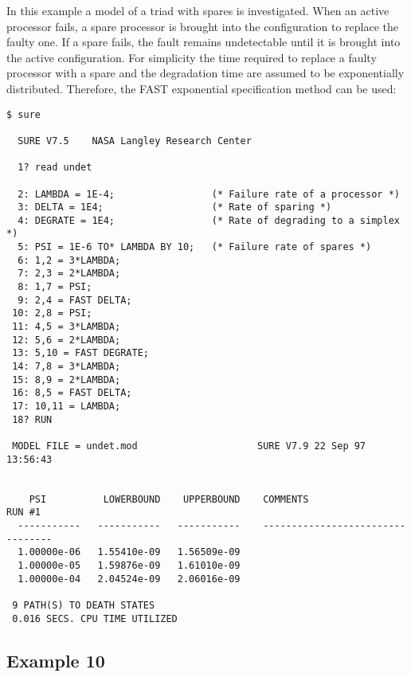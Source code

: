 In this example a model of a triad with spares is investigated.  When an
active processor fails, a spare processor is brought into the configuration to
replace the faulty one.  If a spare fails, the fault remains undetectable
until it is brought into the active configuration.  For simplicity the time
required to replace a faulty processor with a spare and the degradation time
are assumed to be exponentially distributed.  Therefore, the {\isf FAST}
exponential specification method can be used:
\begin{verbatim}
$ sure

  SURE V7.5    NASA Langley Research Center

  1? read undet

  2: LAMBDA = 1E-4;                 (* Failure rate of a processor *)
  3: DELTA = 1E4;                   (* Rate of sparing *)
  4: DEGRATE = 1E4;                 (* Rate of degrading to a simplex *)
  5: PSI = 1E-6 TO* LAMBDA BY 10;   (* Failure rate of spares *)
  6: 1,2 = 3*LAMBDA;
  7: 2,3 = 2*LAMBDA;
  8: 1,7 = PSI;
  9: 2,4 = FAST DELTA;
 10: 2,8 = PSI;
 11: 4,5 = 3*LAMBDA;
 12: 5,6 = 2*LAMBDA;
 13: 5,10 = FAST DEGRATE;
 14: 7,8 = 3*LAMBDA;
 15: 8,9 = 2*LAMBDA;
 16: 8,5 = FAST DELTA;
 17: 10,11 = LAMBDA;
 18? RUN

 MODEL FILE = undet.mod                     SURE V7.9 22 Sep 97  13:56:43

 
    PSI          LOWERBOUND    UPPERBOUND    COMMENTS                 RUN #1
  -----------   -----------   -----------    ---------------------------------
  1.00000e-06   1.55410e-09   1.56509e-09
  1.00000e-05   1.59876e-09   1.61010e-09
  1.00000e-04   2.04524e-09   2.06016e-09

 9 PATH(S) TO DEATH STATES
 0.016 SECS. CPU TIME UTILIZED
\end{verbatim}

\subsection{Example 10}

